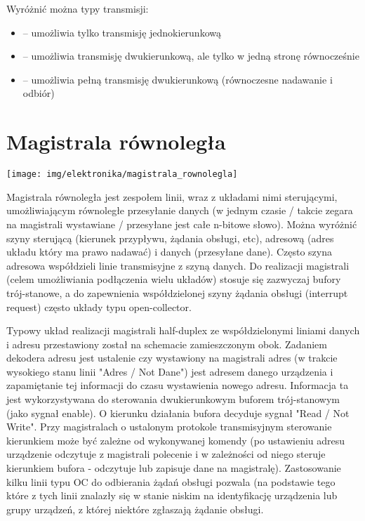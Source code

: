 Wyróżnić można typy transmisji:
\begin{itemize}
\item {} -- umożliwia tylko transmisję jednokierunkową
\item {} -- umożliwia transmisję dwukierunkową, ale tylko w jedną stronę równocześnie
\item {} -- umożliwia pełną transmisję dwukierunkową (równoczesne nadawanie i odbiór)
\end{itemize}

\section{Magistrala równoległa}

\begin{center}
    \texttt{[image: img/elektronika/magistrala\_rownolegla]}
\end{center}
Magistrala równoległa jest zespołem linii, wraz z układami nimi sterującymi, umożliwiającym równoległe przesyłanie danych (w jednym czasie / takcie zegara na magistrali wystawiane / przesyłane jest całe n-bitowe słowo).
Można wyróżnić szyny sterującą (kierunek przypływu, żądania obsługi, etc), adresową (adres układu który ma prawo nadawać) i danych (przesyłane dane). Często szyna adresowa współdzieli linie transmisyjne z szyną danych.
Do realizacji magistrali (celem umożliwiania podłączenia wielu układów) stosuje się zazwyczaj bufory trój-stanowe, a do zapewnienia współdzielonej szyny żądania obsługi (interrupt request) często układy typu open-collector.

Typowy układ realizacji magistrali half-duplex ze współdzielonymi liniami danych i adresu przestawiony został na schemacie zamieszczonym obok.
Zadaniem dekodera adresu jest ustalenie czy wystawiony na magistrali adres (w trakcie wysokiego stanu linii "Adres / Not Dane") jest adresem danego urządzenia i zapamiętanie tej informacji do czasu wystawienia nowego adresu. Informacja ta jest wykorzystywana do sterowania dwukierunkowym buforem trój-stanowym (jako sygnał enable).
O kierunku działania bufora decyduje sygnał "Read / Not Write". Przy magistralach o ustalonym protokole transmisyjnym sterowanie kierunkiem może być zależne od wykonywanej komendy (po ustawieniu adresu urządzenie odczytuje z magistrali polecenie i w zależności od niego steruje kierunkiem bufora - odczytuje lub zapisuje dane na magistralę).
Zastosowanie kilku linii typu OC do odbierania żądań obsługi pozwala (na podstawie tego które z tych linii znalazły się w stanie niskim na identyfikację urządzenia lub grupy urządzeń, z której niektóre zgłaszają żądanie obsługi.

